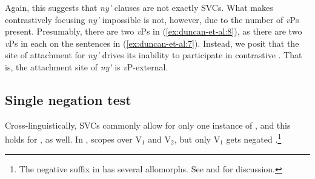 \documentclass[output=paper]{../langsci/langscibook}
\begin{document}
 \label{ex:duncan-et-al:8}
\z

\noindent Again, this suggests that \textit{ny\'{\textturnv}\ng} clauses are not exactly SVCs. What makes contrastively focusing \textit{ny\'{\textturnv}\ng} impossible is not, however, due to the number of \textit{v}Ps present. Presumably, there are two \textit{v}Ps in (\ref{ex:duncan-et-al:8}), as there are two \textit{v}Ps in each on the sentences in (\ref{ex:duncan-et-al:7}). Instead, we posit that the site of attachment for \textit{ny\'{\textturnv}\ng} drives its inability to participate in contrastive . That is, the attachment site of \textit{ny\'{\textturnv}\ng} is \textit{v}P-external.

\subsection{Single negation test}\label{sec:duncan-et-al:2.3}

Cross-linguistically, SVCs commonly allow for only one instance of  \citep{hiraiwa2008object}, and this holds for , as well. In ,  scopes over V$_1$ and V$_2$, but only V$_1$ gets negated \citep{major2015serial}.\footnote{The negative suffix in  has several allomorphs. See \citet[124-127]{akinlabi2003} and \citet[89]{duncan2016parallel} for discussion.}

\ea\label{ex:duncan-et-al:9}
\z
\z
\end{document}
